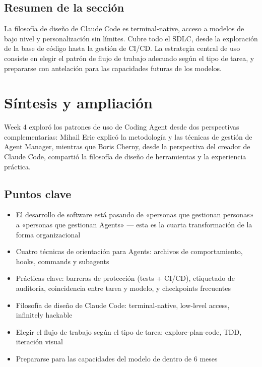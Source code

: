 \documentclass[a4paper]{article}
\begin{document}
\subsection{Resumen de la sección}

La filosofía de diseño de Claude Code es terminal-native, acceso a modelos de bajo nivel y personalización sin límites. Cubre todo el SDLC, desde la exploración de la base de código hasta la gestión de CI/CD. La estrategia central de uso consiste en elegir el patrón de flujo de trabajo adecuado según el tipo de tarea, y prepararse con antelación para las capacidades futuras de los modelos.

\section{Síntesis y ampliación}

Week 4 exploró los patrones de uso de Coding Agent desde dos perspectivas complementarias: Mihail Eric explicó la metodología y las técnicas de gestión de Agent Manager, mientras que Boris Cherny, desde la perspectiva del creador de Claude Code, compartió la filosofía de diseño de herramientas y la experiencia práctica.

\subsection{Puntos clave}

\begin{itemize}
    \item El desarrollo de software está pasando de «personas que gestionan personas» a «personas que gestionan Agents» — esta es la cuarta transformación de la forma organizacional
    \item Cuatro técnicas de orientación para Agents: archivos de comportamiento, hooks, commands y subagents
    \item Prácticas clave: barreras de protección (tests + CI/CD), etiquetado de auditoría, coincidencia entre tarea y modelo, y checkpoints frecuentes
    \item Filosofía de diseño de Claude Code: terminal-native, low-level access, infinitely hackable
    \item Elegir el flujo de trabajo según el tipo de tarea: explore-plan-code, TDD, iteración visual
    \item Prepararse para las capacidades del modelo de dentro de 6 meses
\end{itemize}
\end{document}

